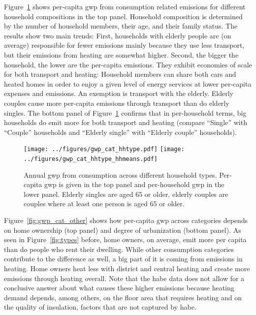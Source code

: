 \documentclass[a4paper,11pt,abstract=true]{scrartcl}
\begin{document}
Figure~\ref{fig:gwp_cat_hhtype} shows per-capita \ac{gwp} from consumption related emissions for different household compositions in the top panel.
Household composition is determined by the number of household members, their age, and their family status.
The results show two main trends:
First, households with elderly people are (on average) responsible for fewer emissions mainly because they use less transport, but their emissions from heating are somewhat higher.
Second, the bigger the household, the lower are the per-capita emissions.
They exhibit economies of scale for both transport and heating:
Household members can share both cars and heated homes in order to enjoy a given level of energy services at lower per-capita expenses and emissions.
An exemption is transport with the elderly.
Elderly couples cause more per-capita emissions through transport than do elderly singles.
The bottom panel of Figure~\ref{fig:gwp_cat_hhtype} confirms that in per-household terms, big households do emit more for both transport and heating (compare ``Single'' with ``Couple'' households and ``Elderly single'' with ``Elderly couple'' households).

\begin{figure}[htp]
  \centering
  \texttt{[image: ../figures/gwp\_cat\_hhtype.pdf]}
  \texttt{[image: ../figures/gwp\_cat\_hhtype\_hhmeans.pdf]}
  \caption[\ac{gwp} per decile]{
    Annual \ac{gwp} from consumption across different household types.
    Per-capita \ac{gwp} is given in the top panel and per-household \ac{gwp} in the lower panel.
    Elderly singles are aged 65 or older, elderly couples are couples where at least one person is aged 65 or older.
  }
  \label{fig:gwp_cat_hhtype}
\end{figure}

Figure~\ref{fig:gwp_cat_other} shows how per-capita \ac{gwp} across categories depends on home ownership (top panel) and degree of urbanization (bottom panel).
As seen in Figure~\ref{fig:types} before, home owners, on average, emit more per capita than do people who rent their dwelling.
While other consumption categories contribute to the difference as well, a big part of it is coming from emissions in heating.
Home owners heat less with district and central heating and create more emissions through heating overall.
Note that the \ac{habe} data does not allow for a conclusive answer about what causes these higher emissions because heating demand depends, among others, on the floor area that requires heating and on the quality of insulation, factors that are not captured by \ac{habe}.
\end{document}
